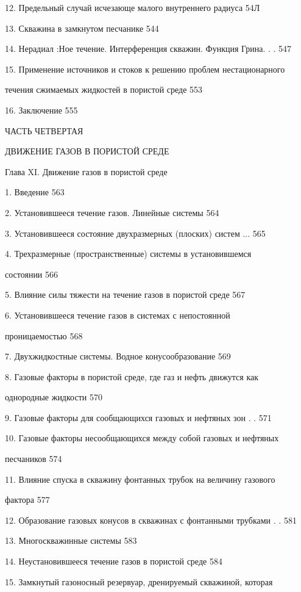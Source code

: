 \documentclass[
  11pt,
]{article}
\begin{document}
12. Предельный случай исчезающе малого внутреннего радиуса 54\textquotesingle Л \par
13. Скважина в замкнутом песчанике 544 \par
14. Нерадиал :Ное течение. Интерференция скважин. Функция Грина. . . 547 \par
15. Применение источников и стоков к решению проблем нестационарного \par
течения сжимаемых жидкостей в пористой среде 553 \par
16. Заключение 555 \par
ЧАСТЬ ЧЕТВЕРТАЯ \par
ДВИЖЕНИЕ ГАЗОВ В ПОРИСТОЙ СРЕДЕ \par
Глава XI. Движение газов в пористой среде \par
1. Введение 563 \par
2. Установившееся течение газов. Линейные системы 564 \par
3. Установившееся состояние двухразмерных (плоских) систем ... 565 \par
4. Трехразмерные (пространственные) системы в установившемся  \par
состоянии 566 \par
5. Влияние силы тяжести на течение газов в пористой среде 567 \par
6. Установившееся течение газов в системах с непостоянной  \par
проницаемостью 568 \par
7. Двухжидкостные системы. Водное конусообразование 569 \par
8. Газовые факторы в пористой среде, где газ и нефть движутся как  \par
однородные жидкости 570 \par
9. Газовые факторы для сообщающихся газовых и нефтяных зон . . 571 \par
10. Газовые факторы несообщающихся между собой газовых и нефтяных \par
песчаников 574 \par
11. Влияние спуска в скважину фонтанных трубок на величину газового \par
фактора 577 \par
12. Образование газовых конусов в скважинах с фонтанными трубками . . 581 \par
13. Многоскважинные системы 583 \par
14. Неустановившееся течение газов в пористой среде 584 \par
15. Замкнутый газоносный резервуар, дренируемый скважиной, которая \par
\end{document}
